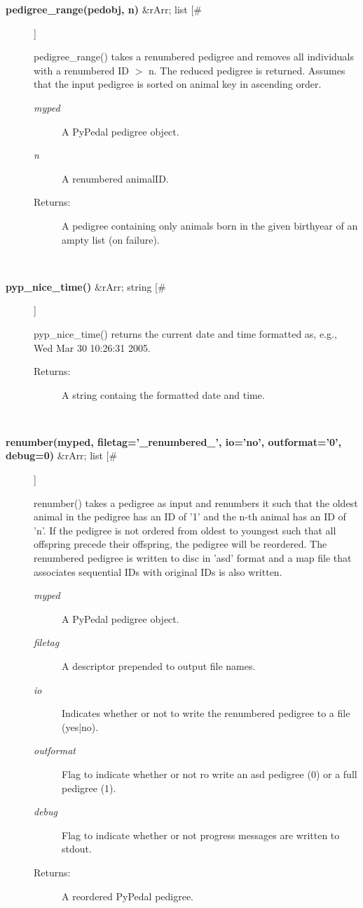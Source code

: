 \documentclass[10pt]{article}
\begin{document}
\begin{description}
\item[\textbf{pedigree\_range(pedobj, n)}
 \&rArr; list [\#]]

 pedigree\_range() takes a renumbered pedigree and removes all individuals with a renumbered ID $>$ n. The reduced pedigree is returned. Assumes that the input pedigree is sorted on animal key in ascending order.
\begin{description}
\item[\emph{myped}
] A PyPedal pedigree object.
\item[\emph{n}
] A renumbered animalID.
\item[Returns:] A pedigree containing only animals born in the given birthyear of an ampty list (on failure).

\end{description}
\\ 

\item[\textbf{pyp\_nice\_time()}
 \&rArr; string [\#]]

 pyp\_nice\_time() returns the current date and time formatted as, e.g., Wed Mar 30 10:26:31 2005.
\begin{description}
\item[Returns:] A string containg the formatted date and time.

\end{description}
\\ 

\item[\textbf{renumber(myped, filetag='\_renumbered\_', io='no', outformat='0', debug=0)}
 \&rArr; list [\#]]

 renumber() takes a pedigree as input and renumbers it such that the oldest animal in the pedigree has an ID of '1' and the n-th animal has an ID of 'n'. If the pedigree is not ordered from oldest to youngest such that all offspring precede their offspring, the pedigree will be reordered. The renumbered pedigree is written to disc in 'asd' format and a map file that associates sequential IDs with original IDs is also written.
\begin{description}
\item[\emph{myped}
] A PyPedal pedigree object.
\item[\emph{filetag}
] A descriptor prepended to output file names.
\item[\emph{io}
] Indicates whether or not to write the renumbered pedigree to a file (yes|no).
\item[\emph{outformat}
] Flag to indicate whether or not ro write an asd pedigree (0) or a full pedigree (1).
\item[\emph{debug}
] Flag to indicate whether or not progress messages are written to stdout.
\item[Returns:] A reordered PyPedal pedigree.


\end{description}
\end{description}
\end{document}
